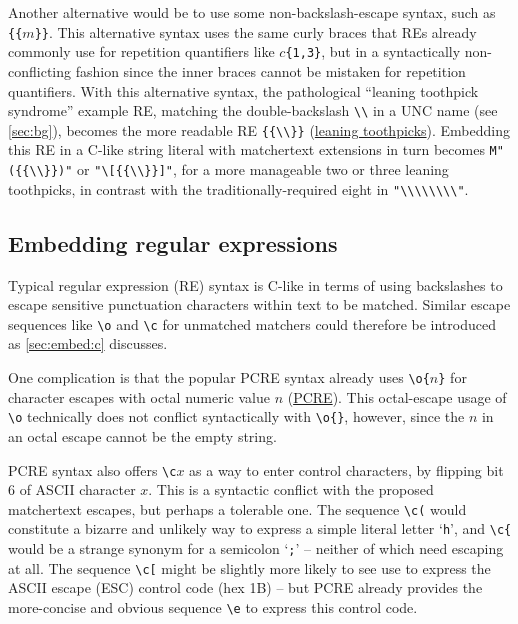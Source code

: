 Another alternative would be to use some non-backslash-escape syntax,
such as \verb|{{|$m$\verb|}}|.
This alternative syntax uses the same curly braces
that REs already commonly use
for repetition quantifiers like $c$\verb|{1,3}|,
but in a syntactically non-conflicting fashion
since the inner braces cannot be mistaken for repetition quantifiers.
With this alternative syntax,
the pathological ``leaning toothpick syndrome'' example RE,
matching the double-backslash \verb|\\| in a UNC name (see \cref{sec:bg}),
becomes the more readable RE \verb|{{\\}}|
(\href{https://en.wikipedia.org/wiki/Leaning_toothpick_syndrome}{leaning toothpicks}).
Embedding this RE in a C-like string literal with matchertext extensions
in turn becomes \verb|M"({{\\}})"| or \verb|"\[{{\\}}]"|,
for a more manageable two or three leaning toothpicks,
in contrast with the traditionally-required eight in \verb|"\\\\\\\\"|.

\subsection{Embedding regular expressions}
\label{app:regex:embed}

Typical regular expression (RE) syntax is C-like
in terms of using backslashes to escape sensitive punctuation characters
within text to be matched.
Similar escape sequences like \verb|\o| and \verb|\c| for unmatched matchers
could therefore be introduced as \cref{sec:embed:c} discusses.

One complication is that the popular
PCRE syntax
already uses \verb|\o{|$n$\verb|}|
for character escapes with octal numeric value $n$
(\href{https://www.pcre.org/original/doc/html/pcrepattern.html}{PCRE}).
This octal-escape usage of \verb|\o|
technically does not conflict syntactically
with \verb|\o{}|, however,
since the $n$ in an octal escape cannot be the empty string.

PCRE syntax also offers \verb|\c|$x$ as a way to enter control characters,
by flipping bit 6 of ASCII character $x$.
This is a syntactic conflict with the proposed matchertext escapes,
but perhaps a tolerable one.
The sequence \verb|\c(| would constitute
a bizarre and unlikely way to express a simple literal letter `\verb|h|',
and \verb|\c{| would be a strange synonym for a semicolon `\verb|;|' --
neither of which need escaping at all.
The sequence \verb|\c[| might be slightly more likely to see use
to express the ASCII escape (ESC) control code (hex 1B) --
but PCRE already provides the more-concise and obvious sequence \verb|\e|
to express this control code.

